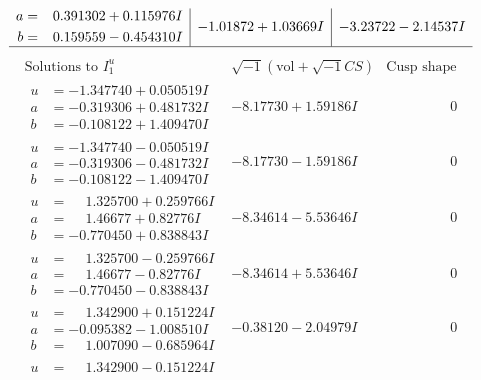 \documentclass[1p]{elsarticle_modified}
\theoremstyle{definition}
\newcommand{\I}{\sqrt{-1}}
\begin{document}
$$\begin{array}{c|c|c}
\begin{aligned}
a &= \phantom{-}0.391302 + 0.115976 I \\
b &= \phantom{-}0.159559 - 0.454310 I\end{aligned}
 & -1.01872 + 1.03669 I & -3.23722 - 2.14537 I\\
 \hline 
 \end{array}$$\newpage$$\begin{array}{c|c|c}  
\text{Solutions to }I^u_{1}& \I (\text{vol} + \sqrt{-1}CS) & \text{Cusp shape}\\
 \hline 
\begin{aligned}
u &= -1.347740 + 0.050519 I \\
a &= -0.319306 + 0.481732 I \\
b &= -0.108122 + 1.409470 I\end{aligned}
 & -8.17730 + 1.59186 I & \phantom{-0.000000 } 0 \\ \hline\begin{aligned}
u &= -1.347740 - 0.050519 I \\
a &= -0.319306 - 0.481732 I \\
b &= -0.108122 - 1.409470 I\end{aligned}
 & -8.17730 - 1.59186 I & \phantom{-0.000000 } 0 \\ \hline\begin{aligned}
u &= \phantom{-}1.325700 + 0.259766 I \\
a &= \phantom{-}1.46677 + 0.82776 I \\
b &= -0.770450 + 0.838843 I\end{aligned}
 & -8.34614 - 5.53646 I & \phantom{-0.000000 } 0 \\ \hline\begin{aligned}
u &= \phantom{-}1.325700 - 0.259766 I \\
a &= \phantom{-}1.46677 - 0.82776 I \\
b &= -0.770450 - 0.838843 I\end{aligned}
 & -8.34614 + 5.53646 I & \phantom{-0.000000 } 0 \\ \hline\begin{aligned}
u &= \phantom{-}1.342900 + 0.151224 I \\
a &= -0.095382 - 1.008510 I \\
b &= \phantom{-}1.007090 - 0.685964 I\end{aligned}
 & -0.38120 - 2.04979 I & \phantom{-0.000000 } 0 \\ \hline\begin{aligned}
u &= \phantom{-}1.342900 - 0.151224 I \\

\end{aligned}
\end{array}$$
\end{document}
